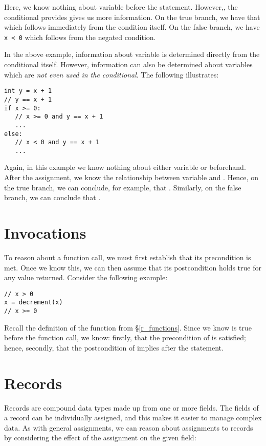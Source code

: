 Here, we know nothing about variable  before the statement.  However,, the conditional provides gives us more information.  On the true branch, we have that  which follows immediately from the condition itself.  On the false branch, we have \lstinline{x < 0} which follows from the negated condition.

In the above example, information about variable  is determined directly from the conditional itself.  However, information can also be determined about variables which are {\em not even used in the conditional}.  The following illustrates:

\begin{lstlisting}
int y = x + 1
// y == x + 1
if x >= 0:
   // x >= 0 and y == x + 1
   ...
else:
   // x < 0 and y == x + 1
   ...
\end{lstlisting}

Again, in this example we know nothing about either variable  or  beforehand.  After the assignment, we know the relationship between variable  and .  Hence, on the true branch, we can conclude, for example, that .  Similarly, on the false branch, we can conclude that .

\section{Invocations}

To reason about a function call, we must first establish that its precondition is met.  Once we know this, we can then assume that its postcondition holds true for any value returned.  Consider the following example:

\begin{lstlisting}
// x > 0
x = decrement(x)
// x >= 0
\end{lstlisting}

Recall the definition of the  function from \S\ref{r_functions}.  Since we know  is true before the function call, we know: firstly, that the precondition of  is satisfied; hence, secondly, that the postcondition of  implies  after the statement.

\section{Records}
Records are compound data types made up from one or more fields.  The fields of a record can be individually assigned, and this makes it easier to manage complex data.  As with general assignments, we can reason about assignments to records by considering the effect of the assignment on the given field:

